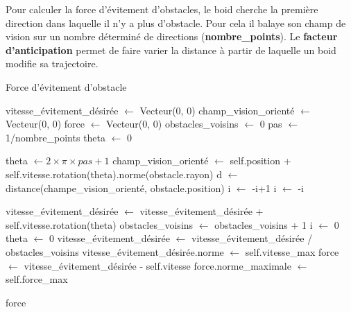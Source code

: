 \documentclass{article}
\begin{document}
Pour calculer la force d'évitement d'obstacles, le boid cherche la première direction dans laquelle il n'y a plus d'obstacle. Pour cela il balaye son champ de vision sur un nombre déterminé de directions (\textbf{nombre\_points}). Le \textbf{facteur d'anticipation} permet de faire varier la distance à partir de laquelle un boid modifie sa trajectoire.
\begin{algorithm}[H]
    \caption{Force d'évitement d'obstacle}
    \begin{algorithmic}
        \STATE vitesse\_évitement\_désirée $\leftarrow$ Vecteur(0, 0)
        \STATE champ\_vision\_orienté $\leftarrow$ Vecteur(0, 0)
        \STATE force $\leftarrow$ Vecteur(0, 0)
        \STATE obstacles\_voisins $\leftarrow$ 0
        \medbreak
        \STATE {}
        pas $\leftarrow$ 1/nombre\_points
        theta $\leftarrow$ 0

        \medbreak
        \STATE theta $\leftarrow 2 \times \pi \times pas + 1$
        \STATE champ\_vision\_orienté $\leftarrow$ self.position + self.vitesse.rotation(theta).norme(obstacle.rayon)
        \STATE d $\leftarrow$ distance(champe\_vision\_orienté, obstacle.position)
        \STATE i $\leftarrow$ -i+1
        \ELSE
        \STATE i $\leftarrow$ -i
        \ENDIF
        \ENDWHILE
        \ENDFOR

        \medbreak

        \STATE vitesse\_évitement\_désirée $\leftarrow$ vitesse\_évitement\_désirée + self.vitesse.rotation(theta)
        \STATE obstacles\_voisins $\leftarrow$ obstacles\_voisins + 1
        \ENDIF
        \medbreak
        \STATE i $\leftarrow$ 0
        \STATE theta $\leftarrow$ 0
        \medbreak
        \STATE vitesse\_évitement\_désirée $\leftarrow$ vitesse\_évitement\_désirée / obstacles\_voisins
        \STATE vitesse\_évitement\_désirée.norme $\leftarrow$ self.vitesse\_max
        \STATE force $\leftarrow$  vitesse\_évitement\_désirée - self.vitesse
        \STATE force.norme\_maximale $\leftarrow$ self.force\_max
        \ENDIF

        \medbreak

        \RETURN force

    \end{algorithmic}
\end{algorithm}
\end{document}
